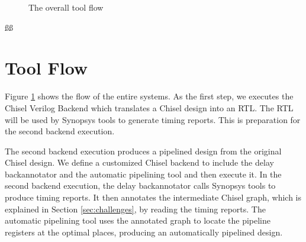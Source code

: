 \begin{figure}
	\centering
    \caption{The overall tool flow}
	\label{fig:toolflow}
\end{figure}
ßß
\section{Tool Flow}
Figure \ref{fig:toolflow} shows the flow of the entire systems. As the first step, we executes the Chisel Verilog Backend which translates a Chisel design into an RTL. The RTL will be used by Synopsys tools to generate timing reports. This is preparation for the second backend execution.

The second backend execution produces a pipelined design from the original Chisel design. We define a customized Chisel backend to include the delay backannotator and the automatic pipelining tool and then execute it. In the second backend execution, the delay backannotator calls Synopsys tools to produce timing reports. It then annotates the intermediate Chisel graph, which is explained in Section \ref{sec:challenges}, by reading the timing reports. The automatic pipelining tool uses the annotated graph to locate the pipeline registers at the optimal places, producing an automatically pipelined design.
